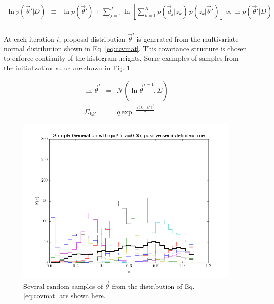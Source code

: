 \documentclass[12pt, onecolumn]{emulateapj}
\newcommand{\textul}{\underline}
\begin{document}
\begin{eqnarray}
\label{eq:disc-post}
\ln\tilde{p}(\vec{\theta}'|\textul{D}) &\equiv& \ln p(\vec{\theta}') + \sum_{j=1}^{J}\ln\left[\sum_{k=1}^{K}p(\vec{d}_{j}|z_{k})\ p(z_{k}|\vec{\theta}')\right] \propto \ln p(\vec{\theta}'|\textul{D})\\
\end{eqnarray}

At each iteration $i$, proposal distribution $\vec{\theta}^{i}$ is generated from the multivariate normal distribution shown in Eq. \ref{eq:covmat}.  This covariance structure is chosen to enforce continuity of the histogram heights.  Some examples of samples from the initialization value are shown in Fig. \ref{fig:priors}.

\begin{mathletters}
\begin{eqnarray}
\label{eq:covmat}
\ln\vec{\theta}^{i} &=& \mathcal{N}(\ln\vec{\theta}^{i-1},\textul{\Sigma})\\
\Sigma_{kk'} &=& q\exp^{-\frac{a(k-k')^{2}}{2}}\nonumber
\end{eqnarray}
\end{mathletters}

\begin{figure}
\label{fig:priors}
\includegraphics[scale=0.5]{samples5.png}
\caption{Several random samples of $\vec{\theta}$ from the distribution of Eq. \ref{eq:covmat} are shown here.  %
}
\end{figure}
\end{document}
